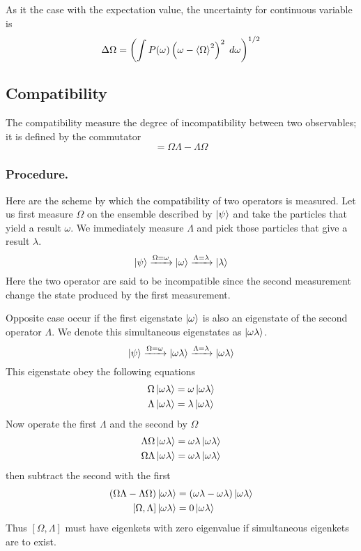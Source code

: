 \documentclass[../../../main.tex]{subfiles}
\begin{document}
As it the case with the expectation value, the uncertainty for continuous variable is 
\begin{equation*}
    \Delta\Omega=\left( \int P(\omega)\left( \omega-\braket{\Omega}^2 \right)^2  \;d \omega\right) ^{1/2}
\end{equation*} 

\subsection{Compatibility}
The compatibility measure the degree of incompatibility between two observables; it is defined by the commutator
\begin{equation*}
    [\Omega\Lambda]=\Omega\Lambda-\Lambda\Omega
\end{equation*}

\subsubsection{Procedure.}
Here are the scheme by which the compatibility of two operators is measured.
Let us first measure $\Omega$ on the ensemble described by $\ket{\psi}$ and take the particles that yield a result $\omega$. 
We immediately measure $\Lambda$ and pick those particles that give a result $\lambda$.
\begin{equation*}
    \ket{\psi}\xrightarrow{\Omega=\omega}\ket{\omega}\xrightarrow{\Lambda=\lambda}\ket{\lambda}
\end{equation*}
Here the two operator are said to be incompatible since the second measurement change the state produced by the first measurement.

Opposite case occur if the first eigenstate $\ket{\omega }$ is also an eigenstate of the second operator $\Lambda$.
We denote this simultaneous eigenstates as $\ket{\omega\lambda}$.
\begin{equation*}
    \ket{\psi}\xrightarrow{\Omega=\omega}\ket{\omega\lambda}\xrightarrow{\Lambda=\lambda}\ket{\omega\lambda}
\end{equation*}
This eigenstate obey the following equations
\begin{align*}
    \Omega \ket{\omega\lambda}&= \omega \ket{\omega\lambda}\\
    \Lambda\ket{\omega\lambda}&= \lambda \ket{\omega\lambda}
\end{align*}
Now operate the first $\Lambda$ and the second by $\Omega$
\begin{align*}
    \Lambda\Omega \ket{\omega\lambda}&= \omega\lambda \ket{\omega\lambda}\\
    \Omega\Lambda\ket{\omega\lambda}&= \omega\lambda \ket{\omega\lambda}
\end{align*}
then subtract the second with the first
\begin{align*}
    (\Omega\Lambda-\Lambda\Omega)\ket{\omega\lambda}&= (\omega\lambda-\omega\lambda)\ket{\omega\lambda}\\
    [\Omega,\Lambda]\ket{\omega\lambda}&= 0 \ket{\omega\lambda}
\end{align*}
Thus $[\Omega,\Lambda]$ must have eigenkets with zero eigenvalue if simultaneous eigenkets are to exist.
\end{document}
